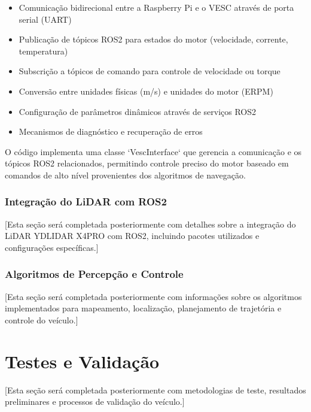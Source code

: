 \begin{itemize}
    \item Comunicação bidirecional entre a Raspberry Pi e o VESC através de porta serial
          (UART)
    \item Publicação de tópicos ROS2 para estados do motor (velocidade, corrente,
          temperatura)
    \item Subscrição a tópicos de comando para controle de velocidade ou torque
    \item Conversão entre unidades físicas (m/s) e unidades do motor (ERPM)
    \item Configuração de parâmetros dinâmicos através de serviços ROS2
    \item Mecanismos de diagnóstico e recuperação de erros
\end{itemize}

O código implementa uma classe `VescInterface` que gerencia a comunicação e os
tópicos ROS2 relacionados, permitindo controle preciso do motor baseado em
comandos de alto nível provenientes dos algoritmos de navegação.

\subsubsection{Integração do LiDAR com ROS2}

[Esta seção será completada posteriormente com detalhes sobre a integração do LiDAR YDLIDAR X4PRO com ROS2, incluindo pacotes utilizados e configurações específicas.]

\subsubsection{Algoritmos de Percepção e Controle}

[Esta seção será completada posteriormente com informações sobre os algoritmos implementados para mapeamento, localização, planejamento de trajetória e controle do veículo.]

\section{Testes e Validação}

 [Esta seção será completada posteriormente com metodologias de teste, resultados preliminares e processos de validação do veículo.]